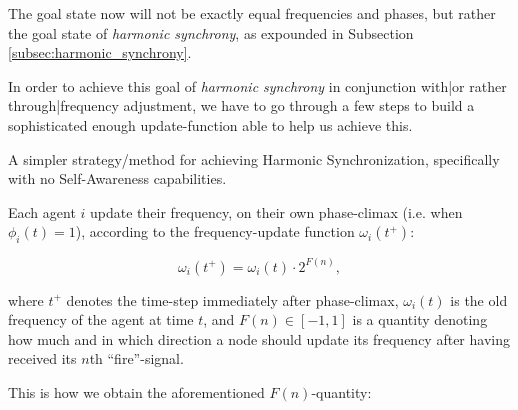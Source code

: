 			The goal state now will not be exactly equal frequencies and phases, but rather the goal state of \textit{harmonic synchrony}, as expounded in Subsection \ref{subsec:harmonic_synchrony}.
			
			In order to achieve this goal of \textit{harmonic synchrony} in conjunction with|or rather through|frequency adjustment, we have to go through a few steps to build a sophisticated enough update-function able to help us achieve this.
			
			
			
			
			
			
			
			
			
			
			A simpler strategy/method for achieving Harmonic Synchronization, specifically with no Self-Awareness capabilities.
			
			
			
			
			
			
			
			
			
			Each agent $i$ update their frequency, on their own phase-climax (i.e. when $\phi_i(t)=1$), according to the frequency-update function $\omega_i(t^+)$:
			
			\begin{equation}
				\omega_i(t^+) = \omega_i(t) \cdot 2^{F(n)},
			\end{equation}
			
			where $t^+$ denotes the time-step immediately after phase-climax, $\omega_i(t)$ is the old frequency of the agent at time $t$, and $F(n) \in [-1,1]$ is a quantity denoting how much and in which direction a node should update its frequency after having received its $n$th ``fire''-signal.
			
			This is how we obtain the aforementioned $F(n)$-quantity:
			
			
			
